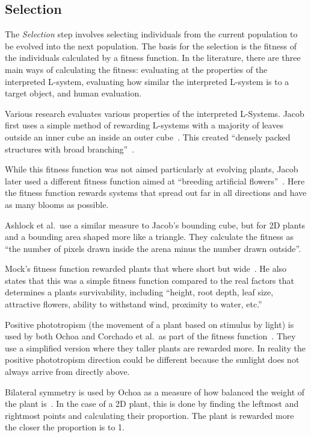 \subsection{Selection}
The \textit{Selection} step involves selecting individuals from the current population to be evolved into the next population.
The basis for the selection is the fitness of the individuals calculated by a fitness function.
In the literature, there are three main ways of calculating the fitness: evaluating at the properties of the interpreted L-system, evaluating how similar the interpreted L-system is to a target object, and human evaluation.

Various research evaluates various properties of the interpreted L-Systems.
Jacob first uses a simple method of rewarding L-systems with a majority of leaves outside an inner cube an inside an outer cube~\cite{1994Jacob}.
This created ``densely packed structures with broad branching''~\cite{1994Jacob}.

While this fitness function was not aimed particularly at evolving plants, Jacob later used a different fitness function aimed at ``breeding artificial flowers''~\cite{1994Jacob}.
Here the fitness function rewards systems that spread out far in all directions and have as many blooms as possible.

Ashlock et al.\ use a similar measure to Jacob's bounding cube, but for 2D plants and a bounding area shaped more like a triangle.
They calculate the fitness as ``the number of pixels drawn inside the arena minus the number drawn outside''.
~\cite{2006Ashlock}

Mock's fitness function rewarded plants that where short but wide~\cite{1998Mock}.
He also states that this was a simple fitness function compared to the real factors that determines a plants survivability, including ``height, root depth, leaf size, attractive flowers, ability to withstand wind, proximity to water, etc.''~\cite{1998Mock}

Positive phototropism (the movement of a plant based on stimulus by light) is used by both Ochoa and Corchado et al.\ as part of the fitness function~\cite{1998Ochoa, 2009Corchado}.
They use a simplified version where they taller plants are rewarded more.
In reality the positive phototropism direction could be different because the sunlight does not always arrive from directly above.

Bilateral symmetry is used by Ochoa as a measure of how balanced the weight of the plant is~\cite{1998Ochoa}.
In the case of a 2D plant, this is done by finding the leftmost and rightmost points and calculating their proportion.
The plant is rewarded more the closer the proportion is to 1.

